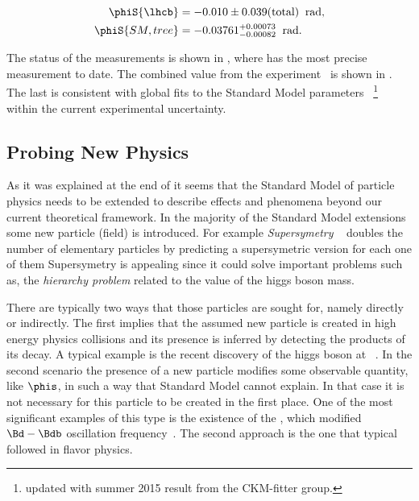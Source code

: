 \begin{subequations}
  \begin{align}
  \centering
  \phiS{\lhcb}           &=  -0.010 \pm 0.039(\text{total})  \;\; \text{rad},
  \label{phis_lhcb}\\
  \phiS{SM,tree}  &= -0.03761 {}^{+0.00073}_{-0.00082}  \;\; \text{rad}.
  \label{phis_theo}
\end{align}
\end{subequations}

The status of the \phis measurements is shown in , where \lhcb has the most precise measurement to date.
The combined \phis value from the \lhcb experiment~\cite{phis-3fb-paper} is shown in .
The last is consistent with global fits to the Standard Model parameters ~\cite{ckm-fitter-phis-pred}\footnote{updated with summer 2015 result from the CKM-fitter group.}
 within the current experimental uncertainty.

\subsection{Probing New Physics}
\label{probe_new_phys}

As it was explained at the end of  it seems that the Standard Model of particle physics needs to be extended
to describe effects and phenomena beyond our current theoretical framework. In the majority of the Standard Model
extensions some new particle (field) is introduced. For example {\it Supersymetry} ~\cite{Golfand:1971iw,Volkov:1973ix,Wess:1974tw}
doubles the number of elementary particles by predicting a supersymetric version for each one of them
Supersymetry is appealing since it could solve important problems such as, the {\it hierarchy problem} related to the value of the
higgs boson mass.

There are typically two ways that those particles are sought for, namely directly or indirectly. The first implies that the
assumed new particle is created in high energy physics collisions and its presence is inferred by detecting the products of
its decay. A typical example is the recent discovery of the higgs boson at \lhc~\cite{higgs-cms,higgs-atlas}.
In the second scenario the presence of a new particle modifies some observable quantity, like $\phis$, in such a way that Standard Model
cannot explain. In that case it is not necessary for this particle to be created in the first place.
One of the most significant examples of this type is the existence of the \tquark, which modified $\Bd-\Bdb$
oscillation frequency~\cite{argus-bbmix}. The second approach is the one that typical followed in flavor physics.


